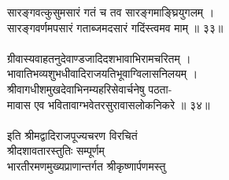 सारङ्गवत्कुसुमसारं गतं च तव सारङ्गमाङ्घ्रियुगलम्  ।\\
सारङ्गवर्णमपसारं गताब्जमदसारं गदिंस्त्वमव माम्  ॥ ३३॥\\
\\
ग्रीवास्यवाहतनुदेवाण्डजादिदशभावाभिरामचरितम्  ।\\
भावातिभव्यशुभधीवादिराजयतिभूवाग्विलासनिलयम्  ।\\
श्रीवागधीशमुखदेवाभिनम्यहरिसेवार्चनेषु पठता-\\
मावास एव भवितावाग्भवेतरसुरावासलोकनिकरे  ॥ ३४॥\\
\\
इति श्रीमद्वादिराजपूज्यचरण विरचितं\\
श्रीदशावतारस्तुतिः सम्पूर्णम्\\
 भारतीरमणमुख्यप्राणान्तर्गत श्रीकृष्णार्पणमस्तु\\